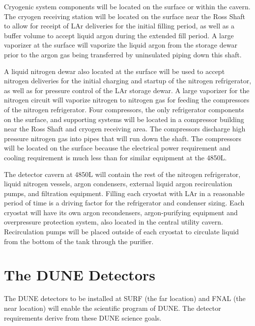 Cryogenic system components will be located on the surface or within the cavern. The cryogen receiving station will be located on the surface near the Ross Shaft to allow for receipt of LAr deliveries for the initial filling period, as well as a buffer volume to accept liquid argon during the extended fill period. A large vaporizer at the surface will vaporize the liquid argon from the storage dewar prior to the argon gas being transferred by uninsulated piping down this shaft. 

A liquid nitrogen dewar also located at the surface will be used to accept nitrogen deliveries for the initial charging and startup of the nitrogen refrigerator, as well as for pressure control of the LAr storage dewar. A large vaporizer for the nitrogen circuit will vaporize nitrogen to nitrogen gas for feeding the compressors of the nitrogen refrigerator. Four compressors, the only refrigerator components on the surface, and supporting systems will be located in a compressor building near the Ross Shaft and cryogen receiving area. The compressors discharge high pressure nitrogen gas into pipes that will run down the shaft. The compressors will be located on the surface because the electrical power requirement and cooling requirement is much less than for similar equipment at the 4850L.  

The detector cavern at 4850L will contain the rest of the nitrogen refrigerator, liquid nitrogen vessels, argon condensers, external liquid argon recirculation pumps, and filtration equipment. Filling each cryostat with LAr in a reasonable period of time is a driving factor for the refrigerator and condenser sizing.  Each cryostat will have its own argon recondensers, argon-purifying equipment and overpressure protection system, also located in the central utility cavern. Recirculation pumps will be placed outside of each %
cryostat to circulate liquid from the bottom of the tank through the purifier.



\section{The DUNE Detectors}

The DUNE detectors to be installed at SURF (the far location) and FNAL (the near location) will enable the scientific program of DUNE.  The detector 
requirements derive from these DUNE science goals.

